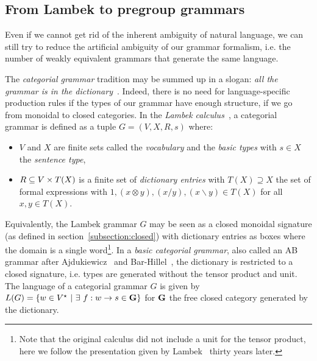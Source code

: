 
\subsection{From Lambek to pregroup grammars}

Even if we cannot get rid of the inherent ambiguity of natural language, we can still try to reduce the artificial ambiguity of our grammar formalism, i.e. the number of weakly equivalent grammars that generate the same language.

The \emph{categorial grammar} tradition may be summed up in a slogan: \emph{all the grammar is in the dictionary}~\cite{Preller07}.
Indeed, there is no need for language-specific production rules if the types of our grammar have enough structure, if we go from monoidal to closed categories.
In the \emph{Lambek calculus}~\cite{Lambek58}, a categorial grammar is defined as a tuple $G = (V, X, R, s)$ where:
\begin{itemize}
\item $V$ and $X$ are finite sets called the \emph{vocabulary} and the \emph{basic types} with $s \in X$ the \emph{sentence type},
\item $R \subseteq V \times T(X)$ is a finite set of \emph{dictionary entries} with $T(X) \supseteq X$ the set of formal expressions with $1, (x \otimes y), (x / y), (x \backslash y) \in T(X)$ for all $x, y \in T(X)$.
\end{itemize}
Equivalently, the Lambek grammar $G$ may be seen as a closed monoidal signature (as defined in section~\ref{subsection:closed}) with dictionary entries as boxes where the domain is a single word\footnote
{Note that the original calculus did not include a unit for the tensor product, here we follow the presentation given by Lambek~\cite{Lambek88} thirty years later.}.
In a \emph{basic categorial grammar}, also called an AB grammar after Ajdukiewicz~\cite{Ajdukiewicz35} and Bar-Hillel~\cite{Bar-Hillel54}, the dictionary is restricted to a closed signature, i.e. types are generated without the tensor product and unit.
The language of a categorial grammar $G$ is given by $L(G) = \{ w \in V^\star \ \vert \ \exists \ f : w \to s \in \G \}$ for $\mathbf{G}$ the free closed category generated by the dictionary.

